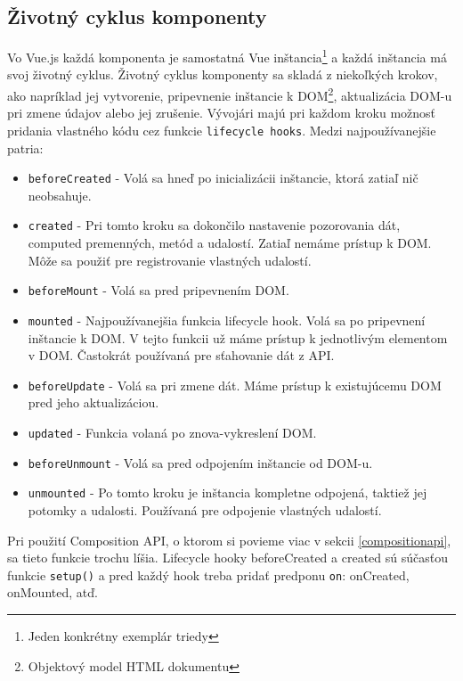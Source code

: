 \subsection*{Životný cyklus komponenty}
Vo Vue.js každá komponenta je samostatná Vue inštancia\footnote{Jeden konkrétny exemplár triedy} a každá inštancia má svoj životný cyklus. Životný cyklus komponenty sa skladá z niekoľkých krokov, ako napríklad jej vytvorenie, pripevnenie inštancie k DOM\footnote{Objektový model HTML dokumentu}, aktualizácia DOM-u pri zmene údajov alebo jej zrušenie. Vývojári majú pri každom kroku možnosť pridania vlastného kódu cez funkcie \texttt{lifecycle hooks}. Medzi najpoužívanejšie patria:
    \begin{itemize}
        \item\texttt{beforeCreated} - Volá sa hneď po inicializácii inštancie, ktorá zatiaľ nič neobsahuje.
        \item\texttt{created} - Pri tomto kroku sa dokončilo nastavenie pozorovania dát, computed premenných, metód a udalostí. Zatiaľ nemáme prístup k DOM. Môže sa použiť pre registrovanie vlastných udalostí.
        \item\texttt{beforeMount} - Volá sa pred pripevnením DOM.
        \item\texttt{mounted} - Najpoužívanejšia funkcia lifecycle hook. Volá sa po pripevnení inštancie k DOM. V tejto funkcii už máme prístup k jednotlivým elementom v DOM. Častokrát používaná pre sťahovanie dát z API.
        \item\texttt{beforeUpdate} - Volá sa pri zmene dát. Máme prístup k existujúcemu DOM pred jeho aktualizáciou.
        \item\texttt{updated} - Funkcia volaná po znova-vykreslení DOM.
        \item\texttt{beforeUnmount} - Volá sa pred odpojením inštancie od DOM-u.
        \item\texttt{unmounted} - Po tomto kroku je inštancia kompletne odpojená, taktiež jej potomky a udalosti. Používaná pre odpojenie vlastných udalostí.
    \end{itemize}

Pri použití Composition API, o ktorom si povieme viac v sekcii \ref{compositionapi}, sa tieto funkcie trochu líšia. Lifecycle hooky beforeCreated a created sú súčasťou funkcie \texttt{setup()} a pred každý hook treba pridať predponu \texttt{on}: onCreated, onMounted, atď. 

